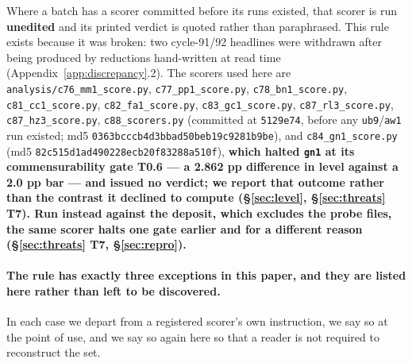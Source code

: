 \documentclass[10pt,letterpaper]{article}
\newcommand{\arm}[1]{\texttt{#1}}
\begin{document}
Where a batch has a scorer committed before its runs existed, that scorer is run
\textbf{unedited} and its printed verdict is quoted rather than paraphrased. This rule exists
because it was broken: two cycle-91/92 headlines were withdrawn after being produced by
reductions hand-written at read time (Appendix~\ref{app:discrepancy}.2). The scorers used here
are \texttt{analysis/c76\_mm1\_score.py}, \texttt{c77\_pp1\_score.py},
\texttt{c78\_bn1\_score.py}, \texttt{c81\_cc1\_score.py}, \texttt{c82\_fa1\_score.py},
\texttt{c83\_gc1\_score.py}, \texttt{c87\_rl3\_score.py}, \texttt{c87\_hz3\_score.py},
\texttt{c88\_scorers.py} (committed at \texttt{5129e74}, before any \arm{ub9}/\arm{aw1} run
existed; md5 \texttt{0363bcccb4d3bbad50beb19c9281b9be}), and \texttt{c84\_gn1\_score.py}
(md5 \texttt{82c515d1ad490228ecb20f83288a510f}), \textbf{which halted \arm{gn1} at its
commensurability gate T0.6 --- a 2.862 pp difference in level against a 2.0 pp bar --- and issued
no verdict; we report that outcome rather than the contrast it
declined to compute (\S\ref{sec:level}, \S\ref{sec:threats} T7). Run instead against the deposit,
which excludes the probe files, the same scorer halts one gate earlier and for a different reason
(\S\ref{sec:threats} T7, \S\ref{sec:repro}).}

\paragraph{The rule has exactly three exceptions in this paper, and they are listed here rather
than left to be discovered.}
In each case we depart from a registered scorer's own instruction, we say so at the point of use,
and we say so again here so that a reader is not required to reconstruct the set.
\end{document}
